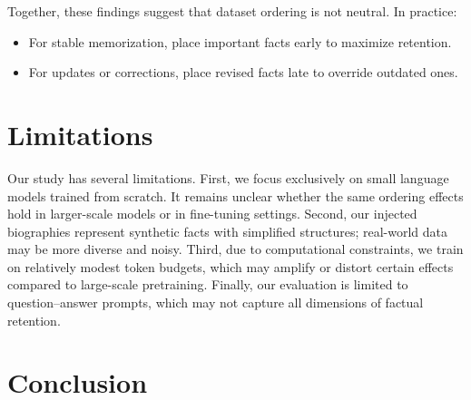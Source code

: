 \documentclass[11pt]{article}
\begin{document}
    Together, these findings suggest that dataset ordering is not neutral. In practice:

    \begin{itemize}
        \item For stable memorization, place important facts early to maximize retention.
        \item For updates or corrections, place revised facts late to override outdated ones.
    \end{itemize}

    \section{Limitations}
    Our study has several limitations. First, we focus exclusively on small language models trained from scratch. It remains unclear whether the same ordering effects hold in larger-scale models or in fine-tuning settings. Second, our injected biographies represent synthetic facts with simplified structures; real-world data may be more diverse and noisy. Third, due to computational constraints, we train on relatively modest token budgets, which may amplify or distort certain effects compared to large-scale pretraining. Finally, our evaluation is limited to question–answer prompts, which may not capture all dimensions of factual retention.

    \section{Conclusion}

    
    
\end{document}
